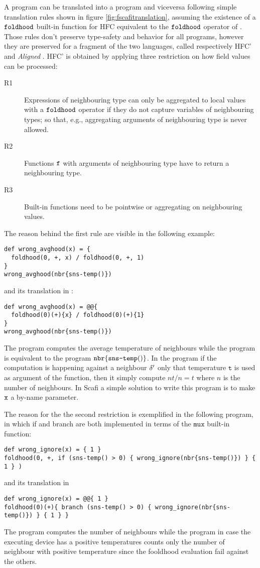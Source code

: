 A \FSCAFI program can be translated into a \HFC{} program and viceversa following simple translation rules shown in figure \ref{fig:fscafitranslation}, assuming the existence of a $\mathtt{foldhood}$ built-in function for HFC equivalent to the $\mathtt{foldhood}$ operator of \FSCAFI. Those rules don't preserve type-safety and behavior for all programs, however they are preserved for a fragment of the two languages, called respectively HFC' and \textit{Aligned} \FSCAFI. HFC' is obtained by applying three restriction on how field values can be processed:
\begin{description}
	\item[R1]
	Expressions of neighbouring type can only be aggregated to local values with a $\mathtt{foldhood}$ operator if they do not capture variables of neighbouring types; so that, e.g., aggregating arguments of neighbouring type is never allowed.
	\item[R2]
	Functions $\mathtt{f}$ with arguments of neighbouring type have to return a neighbouring type.
	\item[R3]
	Built-in functions need to be pointwise or aggregating on neighbouring values.
\end{description}
The reason behind the first rule are visible in the following example:
\begin{lstlisting}[]
def wrong_avghood(x) = {
  foldhood(0, +, x) / foldhood(0, +, 1)
}
wrong_avghood(nbr{sns-temp()})
\end{lstlisting}
and its translation in  \FSCAFI:
\begin{lstlisting}[]
def wrong_avghood(x) = @@{
  foldhood(0)(+){x} / foldhood(0)(+){1}
}
wrong_avghood(nbr{sns-temp()})
\end{lstlisting}
The \HFC{} program computes the average temperature of neighbours while the \FSCAFI{} program is equivalent to the program $\mathtt{nbr}\{\texttt{sns-temp}()\}$. In the \FSCAFI program if the computation is happening against a neighbour $\delta'$ only that temperature $\mathtt{t}$ is used as argument of the function, then it simply compute $nt/n = t$ where $n$ is the number of neighbours. In Scafi a simple solution to write this program is to make $\mathtt{x}$ a by-name parameter.

The reason for the the second restriction is exemplified in the following program, in which if and branch are both implemented in terms of the $\mathtt{mux}$ built-in function:
\begin{lstlisting}[]
def wrong_ignore(x) = { 1 }
foldhood(0, +, if (sns-temp() > 0) { wrong_ignore(nbr{sns-temp()}) } { 1 } )
\end{lstlisting}
and its translation in  \FSCAFI{}
\begin{lstlisting}[]
def wrong_ignore(x) = @@{ 1 }
foldhood(0)(+){ branch (sns-temp() > 0) { wrong_ignore(nbr{sns-temp()}) } { 1 } }
\end{lstlisting}
The \HFC{} program computes the number of neighbours while the \FSCAFI{} program in case the executing device has a positive temperatures counts only the number of neighbour with positive temperature since the fooldhood evaluation fail against the others.

